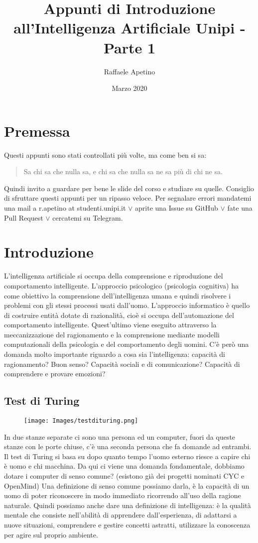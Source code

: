 \documentclass{article}
\title{Appunti di Introduzione all'Intelligenza Artificiale Unipi - Parte 1}
\author{Raffaele Apetino}
\date{Marzo 2020}
\begin{document}
\maketitle

\tableofcontents{}
\clearpage
\section{Premessa}
Questi appunti sono stati controllati più volte, ma come ben si sa:
\begin{quote}
    Sa chi sa che nulla sa, e chi sa che nulla sa ne sa più di chi ne sa.
\end{quote}
Quindi invito a guardare per bene le slide del corso e studiare su quelle. Consiglio di sfruttare questi appunti per un ripasso veloce. Per segnalare errori mandatemi una mail a r.apetino at studenti.unipi.it $\lor$ aprite una Issue su GitHub $\lor$ fate una Pull Request $\lor$ cercatemi su Telegram.

\section{Introduzione}
L'intelligenza artificiale si occupa della comprensione e riproduzione del comportamento intelligente.
L'approccio psicologico (psicologia cognitiva) ha come obiettivo la comprensione dell'intelligenza umana e quindi risolvere i problemi con gli stessi processi usati dall'uomo.
L'approccio informatico è quello di costruire entità dotate di razionalità, cioè si occupa dell'automazione del comportamento intelligente. 
Quest'ultimo viene eseguito attraverso la meccanizzazione del ragionamento e la comprensione mediante modelli computazionali della psicologia e del comportamento degli uomini. \newline 
C'è però una domanda molto importante riguardo a cosa sia l'intelligenza: capacità di ragionamento? Buon senso? Capacità sociali e di comunicazione? Capacità di comprendere e provare emozioni?

\subsection{Test di Turing}
\begin{figure}[H]
    \centering
    \texttt{[image: Images/testdituring.png]}
\end{figure}
In due stanze separate ci sono una persona ed un computer, fuori da queste stanze con le porte chiuse, c'è una seconda persona che fa domande ad entrambi. Il test di Turing si basa su dopo quanto tempo l'uomo esterno riesce a capire chi è uomo e chi macchina. \newline
Da qui ci viene una domanda fondamentale, dobbiamo dotare i computer di senso comune? (esistono già dei progetti nominati CYC e OpenMind) Una definizione di senso comune possiamo darla, è la capacità di un uomo di poter riconoscere in modo immediato ricorrendo all'uso della ragione naturale. Quindi possiamo anche dare una definizione di intelligenza: è la qualità mentale che consiste nell'abilità di apprendere dall'esperienza, di adattarsi a nuove situazioni, comprendere e gestire concetti astratti, utilizzare la conoscenza per agire sul proprio ambiente.
\end{document}
